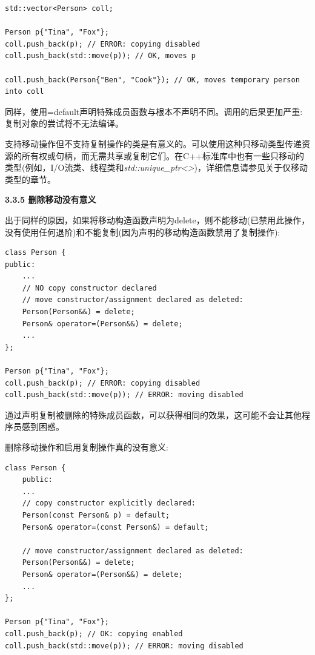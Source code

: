 \begin{lstlisting}[caption={}]
std::vector<Person> coll;

Person p{"Tina", "Fox"};
coll.push_back(p); // ERROR: copying disabled
coll.push_back(std::move(p)); // OK, moves p

coll.push_back(Person{"Ben", "Cook"}); // OK, moves temporary person into coll
\end{lstlisting}

同样，使用=default声明特殊成员函数与根本不声明不同。调用的后果更加严重:复制对象的尝试将不无法编译。\par

支持移动操作但不支持复制操作的类是有意义的。可以使用这种只移动类型传递资源的所有权或句柄，而无需共享或复制它们。在C++标准库中也有一些只移动的类型(例如，I/O流类、线程类和\textit{std::unique\_ptr<>})，详细信息请参见关于仅移动类型的章节。\par

\hspace*{\fill} \par %
\textbf{3.3.5 删除移动没有意义}

出于同样的原因，如果将移动构造函数声明为delete，则不能移动(已禁用此操作，没有使用任何退阶)和不能复制(因为声明的移动构造函数禁用了复制操作):\par

\begin{lstlisting}[caption={}]
class Person {
public:
	...
	// NO copy constructor declared
	// move constructor/assignment declared as deleted:
	Person(Person&&) = delete;
	Person& operator=(Person&&) = delete;
	...
};

Person p{"Tina", "Fox"};
coll.push_back(p); // ERROR: copying disabled
coll.push_back(std::move(p)); // ERROR: moving disabled
\end{lstlisting}

通过声明复制被删除的特殊成员函数，可以获得相同的效果，这可能不会让其他程序员感到困惑。\par

删除移动操作和启用复制操作真的没有意义:\par

\begin{lstlisting}[caption={}]
class Person {
	public:
	...
	// copy constructor explicitly declared:
	Person(const Person& p) = default;
	Person& operator=(const Person&) = default;
	
	// move constructor/assignment declared as deleted:
	Person(Person&&) = delete;
	Person& operator=(Person&&) = delete;
	...
};

Person p{"Tina", "Fox"};
coll.push_back(p); // OK: copying enabled
coll.push_back(std::move(p)); // ERROR: moving disabled
\end{lstlisting}

